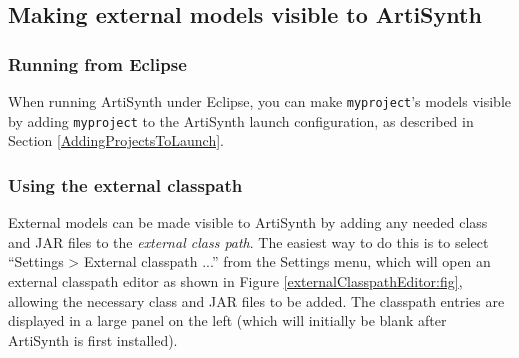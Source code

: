 \subsection{Making external models visible to ArtiSynth}
\label{MakingExternalModelsVisible}

\subsubsection{Running from Eclipse}

When running ArtiSynth under Eclipse, you can make {\tt myproject}'s
models visible by adding {\tt myproject} to the ArtiSynth launch
configuration, as described in Section
\ref{AddingProjectsToLaunch}. 

\subsubsection{Using the external classpath}
\label{ExternalClasspath:sec}

External models can be made visible to ArtiSynth by adding any needed
class \directories{} and JAR files to the {\it external class path}.
The easiest way to do this is to select ``{\sf Settings > External
classpath ...}'' from the {\sf Settings} menu, which will open an
external classpath editor as shown in
Figure \ref{externalClasspathEditor:fig}, allowing the necessary
class \directories{} and JAR files to be added.  The classpath entries
are displayed in a large panel on the left (which will initially be
blank after ArtiSynth is first installed).  

